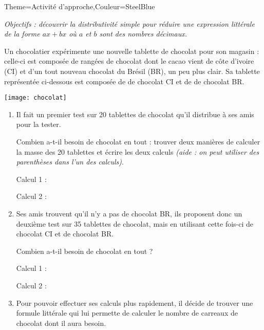 \begin{Maquette}[Cours]{Theme={Activité d'approche},Couleur={SteelBlue}}


   {\it Objectifs : découvrir la distributivité simple pour réduire une expression littérale de la forme $ax+bx$ où $a$ et $b$ sont des nombres décimaux.}

      \begin{AActivite}

         Un chocolatier expérimente une nouvelle tablette de chocolat pour son magasin : celle-ci est composée de rangées de chocolat dont le cacao vient de côte d'ivoire (CI) et d'un tout nouveau chocolat du Brésil (BR), un peu plus clair. Sa tablette représentée ci-dessous est composée de  de chocolat CI et de  de chocolat BR.
         \begin{center}
            \texttt{[image: chocolat]}
         \end{center}
         \begin{enumerate}
            \item Il fait un premier test sur 20 tablettes de chocolat qu'il distribue à ses amis pour la tester. \par
               Combien a-t-il besoin de chocolat en tout : trouver deux manières de calculer la masse des 20 tablettes et écrire les deux calculs {\it (aide : on peut utiliser des parenthèses dans l'un des calculs)}. \par \medskip
               Calcul 1 : \pointilles  \par \bigskip
               Calcul 2 : \pointilles \smallskip
            \item Ses amis trouvent qu'il n'y a pas de chocolat BR, ils proposent donc un deuxième test sur 35 tablettes de chocolat, mais en utilisant cette fois-ci  de chocolat CI et  de chocolat BR. \par
               Combien a-t-il besoin de chocolat en tout ?  \par \medskip
               Calcul 1 : \pointilles  \par \bigskip
               Calcul 2 : \pointilles \smallskip
            \item Pour pouvoir effectuer ses calculs plus rapidement, il décide de trouver une formule littérale qui lui permette de calculer le nombre de carreaux de chocolat dont il aura besoin. \par

\end{enumerate}
\end{AActivite}
\end{Maquette}
